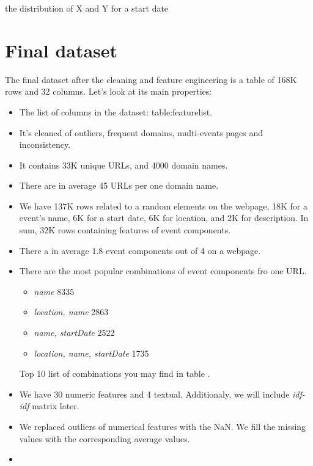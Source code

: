     
     the distribution of X and Y for a start date
    

\section{Final dataset}
The final dataset after the cleaning and feature engineering is a table of 168K rows and 32 columns. Let's look at its main properties: 

\begin{itemize}
    \item The list of columns in the dataset: {table:featurelist}.
    \item It's cleaned of outliers, frequent domains, multi-events pages and inconsistency. 
    \item It contains 33K unique URLs, and  4000 domain names. 
    \item There are in average 45 URLs per one domain name. 
    \item We have 137K rows related to a random elements on the webpage, 18K for a event's name, 6K for a start date, 6K for location, and 2K for description. In sum, 32K rows containing features of event components. 
    \item There a in average 1.8 event components out of 4 on a webpage. 
    \item There are the most popular combinations of event components fro one URL. 
    \begin{itemize}
        \item \textit{name} 8335
        \item \textit{location, name} 2863 
        \item \textit{name, startDate} 2522 
        \item \textit{location, name, startDate} 1735
    \end{itemize}
    Top 10 list of combinations you may find in table .
    \item We have 30 numeric features and 4 textual. Additionaly, we will include \textit{idf-idf} matrix later.
    \item We replaced outliers of numerical features with the NaN. We fill the missing values with the corresponding average values.  
    \item 
\end{itemize}


